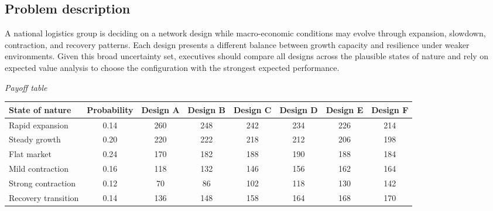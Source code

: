 \begin{ExamProblems}
		\item
		\subsection*{Problem description}
		A national logistics group is deciding on a network design while macro-economic conditions may evolve through expansion, slowdown, contraction, and recovery patterns. Each design presents a different balance between growth capacity and resilience under weaker environments. Given this broad uncertainty set, executives should compare all designs across the plausible states of nature and rely on expected value analysis to choose the configuration with the strongest expected performance.

		\begin{center}
			\textit{Payoff table}
			\begin{tabular}{l c c c c c c c}
				\toprule
				State of nature & Probability & Design A & Design B & Design C & Design D & Design E & Design F \\
				\midrule
				Rapid expansion & 0.14 & 260 & 248 & 242 & 234 & 226 & 214 \\
				Steady growth & 0.20 & 220 & 222 & 218 & 212 & 206 & 198 \\
				Flat market & 0.24 & 170 & 182 & 188 & 190 & 188 & 184 \\
				Mild contraction & 0.16 & 118 & 132 & 146 & 156 & 162 & 164 \\
				Strong contraction & 0.12 & 70 & 86 & 102 & 118 & 130 & 142 \\
				Recovery transition & 0.14 & 136 & 148 & 158 & 164 & 168 & 170 \\
				\bottomrule
			\end{tabular}
		\end{center}


\end{ExamProblems}
